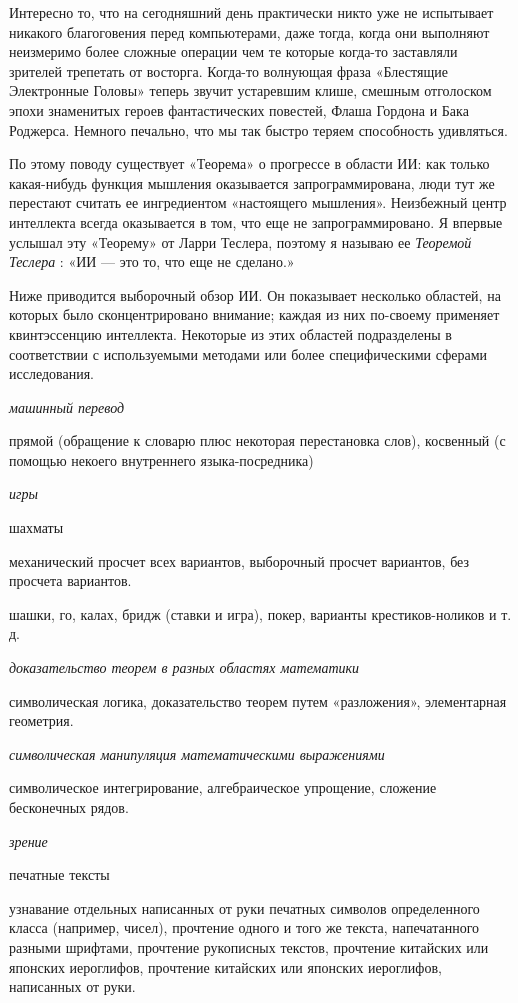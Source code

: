 Интересно то, что на сегодняшний день практически никто уже не испытывает никакого благоговения перед компьютерами, даже тогда, когда они выполняют неизмеримо более сложные операции чем те которые когда-то заставляли зрителей трепетать от восторга. Когда-то волнующая фраза «Блестящие Электронные Головы» теперь звучит устаревшим клише, смешным отголоском эпохи знаменитых героев фантастических повестей, Флаша Гордона и Бака Роджерса. Немного печально, что мы так быстро теряем способность удивляться.

По этому поводу существует «Теорема» о прогрессе в области ИИ: как только какая-нибудь функция мышления оказывается запрограммирована, люди тут же перестают считать ее ингредиентом «настоящего мышления». Неизбежный центр интеллекта всегда оказывается в том, что еще не запрограммировано. Я впервые услышал эту «Теорему» от Ларри Теслера, поэтому я называю ее \emph{Теоремой Теслера} : «ИИ --- это то, что еще не сделано.»

Ниже приводится выборочный обзор ИИ. Он показывает несколько областей, на которых было сконцентрировано внимание; каждая из них по-своему применяет квинтэссенцию интеллекта. Некоторые из этих областей подразделены в соответствии с используемыми методами или более специфическими сферами исследования.

\emph{машинный перевод}

прямой (обращение к словарю плюс некоторая перестановка слов), косвенный (с помощью некоего внутреннего языка-посредника)

\emph{игры}

шахматы

механический просчет всех вариантов, выборочный просчет вариантов, без просчета вариантов.

шашки, го, калах, бридж (ставки и игра), покер, варианты крестиков-ноликов и т. д.

\emph{доказательство теорем в разных областях математики}

символическая логика, доказательство теорем путем «разложения», элементарная геометрия.

\emph{символическая манипуляция математическими выражениями}

символическое интегрирование, алгебраическое упрощение, сложение бесконечных рядов.

\emph{зрение}

печатные тексты

узнавание отдельных написанных от руки печатных символов определенного класса (например, чисел), прочтение одного и того же текста, напечатанного разными шрифтами, прочтение рукописных текстов, прочтение китайских или японских иероглифов, прочтение китайских или японских иероглифов, написанных от руки.

